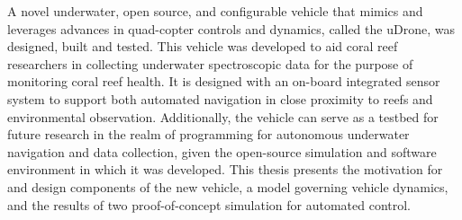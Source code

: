 A novel underwater, open source, and configurable vehicle that mimics and leverages advances in quad-copter controls and dynamics, called the uDrone, was designed, built and tested. This vehicle was developed to aid coral reef researchers in collecting underwater spectroscopic data for the purpose of monitoring coral reef health. It is designed with an on-board integrated sensor system to support both automated navigation in close proximity to reefs and environmental observation. Additionally, the vehicle can serve as a testbed for future research in the realm of programming for autonomous underwater navigation and data collection, given the open-source simulation and software environment in which it was developed. This thesis presents the motivation for and design components of the new vehicle, a model governing vehicle dynamics, and the results of two proof-of-concept simulation for automated control. 